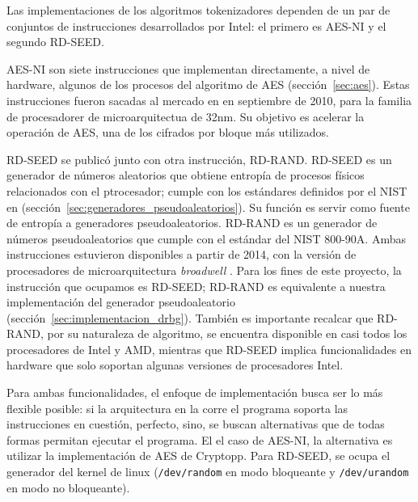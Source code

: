 Las implementaciones de los algoritmos tokenizadores dependen de un par de
conjuntos de instrucciones desarrollados por Intel: el primero es AES-NI y el
segundo RD-SEED.

AES-NI son siete instrucciones que implementan directamente, a nivel de
hardware, algunos de los procesos del algoritmo de AES (sección~\ref{sec:aes}).
Estas instrucciones fueron sacadas al mercado en en septiembre de 2010, para la
familia de procesadorer de microarquitectua de 32nm\cite{aesni_wp}. Su objetivo
es acelerar la operación de AES, una de los cifrados por bloque más
utilizados.

RD-SEED se publicó junto con otra instrucción, RD-RAND. RD-SEED es un generador
de números aleatorios que obtiene entropía de procesos físicos relacionados con
el ptrocesador; cumple con los estándares definidos por el NIST en
\cite{nist_aleatorios} (sección~\ref{sec:generadores_pseudoaleatorios}). Su
función es servir como fuente de entropía a generadores pseudoaleatorios.
RD-RAND es un generador de números pseudoaleatorios que cumple con el estándar
del NIST 800-90A. Ambas instrucciones estuvieron disponibles a partir de 2014,
con la versión de procesadores de microarquitectura \textit{broadwell}
\cite{aesni_wp}. Para los fines de este proyecto, la instrucción que ocupamos
es RD-SEED; RD-RAND es equivalente a nuestra implementación del generador
pseudoaleatorio (sección~\ref{sec:implementacion_drbg}). También es importante
recalcar que RD-RAND, por su naturaleza de algoritmo, se encuentra disponible en
casi todos los procesadores de Intel y AMD, mientras que RD-SEED implica
funcionalidades en hardware que solo soportan algunas versiones de procesadores
Intel.

Para ambas funcionalidades, el enfoque de implementación busca ser lo más
flexible posible: si la arquitectura en la corre el programa soporta las
instrucciones en cuestión, perfecto, sino, se buscan alternativas que de todas
formas permitan ejecutar el programa. El el caso de AES-NI, la alternativa es
utilizar la implementación de AES de Cryptopp. Para RD-SEED, se ocupa el
generador del kernel de linux (\texttt{/dev/random} en modo bloqueante y
\texttt{/dev/urandom} en modo no bloqueante).

